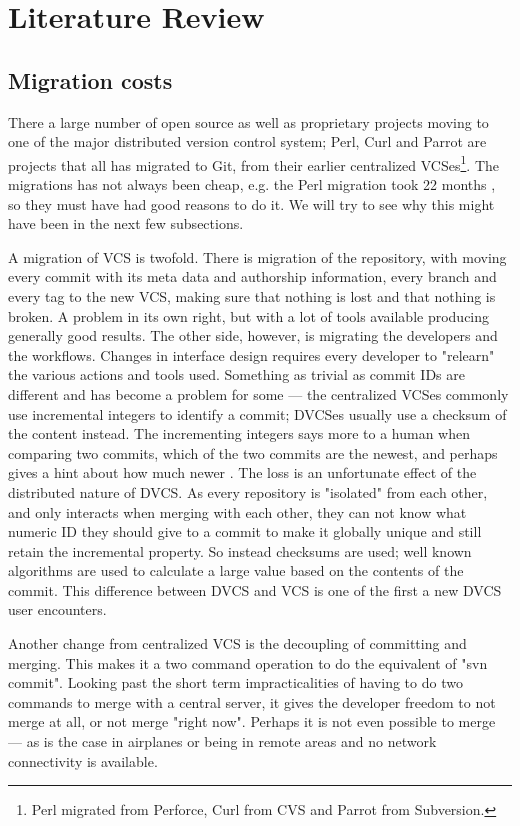 \documentclass{llncs}
\begin{document}
\section{Literature Review}


\subsection{Migration costs}

There a large number of open source as well as proprietary projects
moving to one of the major distributed version control system; Perl,
Curl and Parrot are projects that all has migrated to Git, from their
earlier centralized VCSes\footnote{
 Perl migrated from Perforce, Curl from CVS and Parrot from Subversion.
}. The migrations has not always been cheap, e.g. the Perl migration 
took 22 months \cite{alwis09}, so they must have had good reasons to 
do it. We will try to see why this might have been in the next few
subsections.

A migration of VCS is twofold. There is migration of the repository,
with moving every commit with its meta data and authorship
information, every branch and every tag to the new VCS, making sure
that nothing is lost and that nothing is broken. A problem in its own
right, but with a lot of tools available producing generally good
results. The other side, however, is migrating the developers and the
workflows. Changes in interface design requires every developer to
"relearn" the various actions and tools used. Something as trivial as
commit IDs are different and has become a problem for some
\cite{alwis09} --- the centralized VCSes commonly use incremental
integers to identify a commit; DVCSes usually use a checksum of the
content instead. The incrementing integers says more to a human when
comparing two commits, which of the two commits are the newest, and
perhaps gives a hint about how much newer \cite{bird09}. The loss is
an unfortunate effect of the distributed nature of DVCS. As every
repository is "isolated" from each other, and only interacts when
merging with each other, they can not know what numeric ID they should
give to a commit to make it globally unique and still retain the
incremental property.  So instead checksums are used; well known
algorithms are used to calculate a large value based on the contents
of the commit. This difference between DVCS and VCS is one of the
first a new DVCS user encounters.

Another change from centralized VCS is the decoupling of committing
and merging. This makes it a two command operation to do the
equivalent of "svn commit". Looking past the short term
impracticalities of having to do two commands to merge with a central
server, it gives the developer freedom to not merge at all, or not
merge "right now". Perhaps it is not even possible to merge --- as is
the case in airplanes or being in remote areas and no network
connectivity is available.
\end{document}
